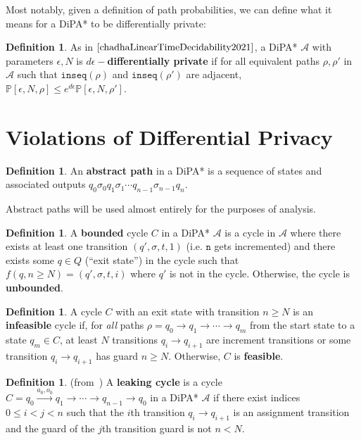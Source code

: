 \documentclass[12pt]{article}
\newcommand{\PP}{\mathbb{P}}
\theoremstyle{definition}
\newtheorem{defn}[thm]{Definition}
\begin{document}
Most notably, given a definition of path probabilities, we can define what it means for a DiPA* to be differentially private:
\begin{defn}
	As in $\cite{chadhaLinearTimeDecidability2021}$, a DiPA* $\mathcal{A}$ with parameters $\epsilon, N$ is \textbf{$d\epsilon-$differentially private} if for all equivalent paths $\rho, \rho'$ in $\mathcal{A}$ such that $\texttt{inseq}(\rho)$ and $\texttt{inseq}(\rho')$ are adjacent, $\PP[\epsilon, N, \rho] \leq e^{d\epsilon}\PP[\epsilon, N, \rho']$.
\end{defn}



\section{Violations of Differential Privacy}

\begin{defn}
	An \textbf{abstract path} in a DiPA* is a sequence of states and associated outputs $q_0\sigma_0q_1\sigma_1\cdots q_{n-1}\sigma_{n-1}q_n$. 
\end{defn}
Abstract paths will be used almost entirely for the purposes of analysis.

\begin{defn}
A \textbf{bounded} cycle $C$ in a DiPA* $\mathcal{A}$ is a cycle in $\mathcal{A}$ where there exists at least one transition $(q', \sigma, t, 1)$ (i.e. $\texttt{n}$ gets incremented) and there exists some $q\in Q$ (``exit state'') in the cycle such that $f(q, n \geq N) = (q', \sigma, t, i)$ where $q'$ is not in the cycle. Otherwise, the cycle is \textbf{unbounded}. 
\end{defn}

\begin{defn}
A cycle $C$ with an exit state with transition $n\geq N$ is an \textbf{infeasible} cycle if, for \textit{all} paths $\rho = q_0\to q_1\to \cdots \to q_m$ from the start state to a state $q_m \in C$, at least $N$ transitions $q_i \to q_{i+1}$ are increment transitions or some transition $q_i \to q_{i+1}$ has guard $n\geq N$. Otherwise, $C$ is \textbf{feasible}.
\end{defn}

\begin{defn} (from~\cite{chadhaLinearTimeDecidability2021}) A \textbf{leaking cycle} is a cycle $C = q_0\xrightarrow{a_0, o_0}q_1\to \cdots\to q_{n-1}\to q_0$ in a DiPA* $\mathcal{A}$ if there exist indices $0\leq i< j<n$ such that the $i$th transition $q_i\to q_{i+1}$ is an assignment transition and the guard of the $j$th transition guard is not $n < N$. 
\end{defn}
\end{document}
